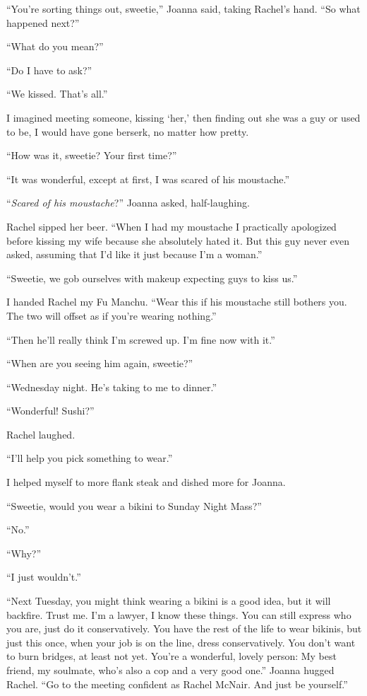 ``You're sorting things out, sweetie,'' Joanna said, taking Rachel's
hand. ``So what happened next?''

``What do you mean?''

``Do I have to ask?''

``We kissed. That's all.''

I imagined meeting someone, kissing `her,' then finding out she was a
guy or used to be, I would have gone berserk, no matter how pretty.

``How was it, sweetie? Your first time?''

``It was wonderful, except at first, I was scared of his moustache.''

``\emph{Scared of his moustache}?'' Joanna asked, half-laughing.

Rachel sipped her beer. ``When I had my moustache I practically
apologized before kissing my wife because she absolutely hated it. But
this guy never even asked, assuming that I'd like it just because I'm a
woman.''

``Sweetie, we gob ourselves with makeup expecting guys to kiss us.''

I handed Rachel my Fu Manchu. ``Wear this if his moustache still bothers
you. The two will offset as if you're wearing nothing.''

``Then he'll really think I'm screwed up. I'm fine now with it.''

``When are you seeing him again, sweetie?''

``Wednesday night. He's taking to me to dinner.''

``Wonderful! Sushi?''

Rachel laughed.

``I'll help you pick something to wear.''

I helped myself to more flank steak and dished more for Joanna.

``Sweetie, would you wear a bikini to Sunday Night Mass?''

``No.''

``Why?''

``I just wouldn't.''

``Next Tuesday, you might think wearing a bikini is a good idea, but it
will backfire. Trust me. I'm a lawyer, I know these things. You can
still express who you are, just do it conservatively. You have the rest
of the life to wear bikinis, but just this once, when your job is on the
line, dress conservatively. You don't want to burn bridges, at least not
yet. You're a wonderful, lovely person: My best friend, my soulmate,
who's also a cop and a very good one.'' Joanna hugged Rachel. ``Go to
the meeting confident as Rachel McNair. And just be yourself.''

